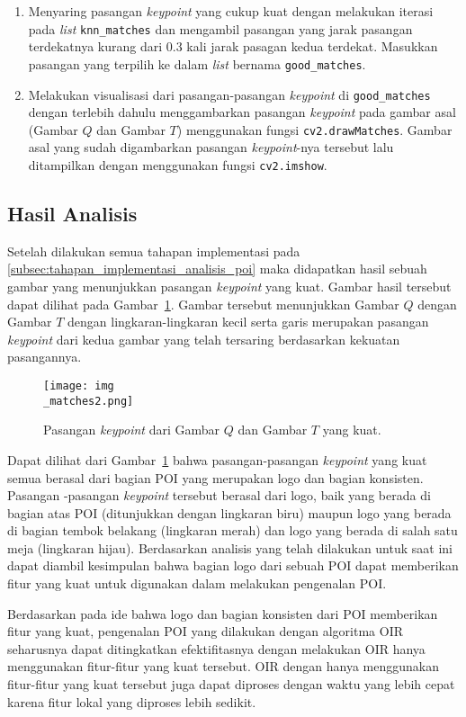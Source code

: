 \begin{enumerate}
	\item Menyaring pasangan \textit{keypoint} yang cukup kuat dengan melakukan iterasi pada \textit{list} \texttt{knn\_matches} dan mengambil pasangan yang jarak pasangan terdekatnya kurang dari $0.3$ kali jarak pasagan kedua terdekat. Masukkan pasangan yang terpilih ke dalam \textit{list} bernama \texttt{good\_matches}.
	\item Melakukan visualisasi dari pasangan-pasangan \textit{keypoint} di \texttt{good\_matches} dengan terlebih dahulu menggambarkan pasangan \textit{keypoint} pada gambar asal (Gambar $Q$ dan Gambar $T$) menggunakan fungsi \texttt{cv2.drawMatches}. Gambar asal yang sudah digambarkan pasangan \textit{keypoint}-nya tersebut lalu ditampilkan dengan menggunakan fungsi \texttt{cv2.imshow}.
\end{enumerate}

\subsection{Hasil Analisis}
Setelah dilakukan semua tahapan implementasi pada \ref{subsec:tahapan_implementasi_analisis_poi} maka didapatkan hasil sebuah gambar yang menunjukkan pasangan \textit{keypoint} yang kuat. Gambar hasil tersebut dapat dilihat pada Gambar~\ref{fig:keypoint_matches}. Gambar tersebut menunjukkan Gambar $Q$ dengan Gambar $T$ dengan lingkaran-lingkaran kecil serta garis merupakan pasangan \textit{keypoint} dari kedua gambar yang telah tersaring berdasarkan kekuatan pasangannya.
\begin{figure}[H]
	\centering
	\texttt{[image: img\\\_matches2.png]}
	\caption{Pasangan \textit{keypoint} dari Gambar $Q$ dan Gambar $T$ yang kuat.}
	\label{fig:keypoint_matches}
\end{figure}

Dapat dilihat dari Gambar~\ref{fig:keypoint_matches} bahwa pasangan-pasangan \textit{keypoint} yang kuat semua berasal dari bagian POI yang merupakan logo dan bagian konsisten. Pasangan -pasangan \textit{keypoint} tersebut berasal dari logo, baik yang berada di bagian atas POI (ditunjukkan dengan lingkaran biru) maupun logo yang berada di bagian tembok belakang (lingkaran merah) dan logo yang berada di salah satu meja (lingkaran hijau). Berdasarkan analisis yang telah dilakukan untuk saat ini dapat diambil kesimpulan bahwa bagian logo dari sebuah POI dapat memberikan fitur yang kuat untuk digunakan dalam melakukan pengenalan POI. 

Berdasarkan pada ide bahwa logo dan bagian konsisten dari POI memberikan fitur yang kuat, pengenalan POI yang dilakukan dengan algoritma OIR seharusnya dapat ditingkatkan efektifitasnya dengan melakukan OIR hanya menggunakan fitur-fitur yang kuat tersebut. OIR dengan hanya menggunakan fitur-fitur yang kuat tersebut juga dapat diproses dengan waktu yang lebih cepat karena fitur lokal yang diproses lebih sedikit. 

